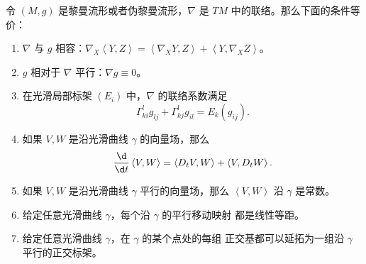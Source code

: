\documentclass[fontset=none]{Notes}
\newcommand{\inn}[1]{\left\langle #1\right\rangle}
\begin{document}
\begin{proposition}[度量联络的特征]\label{prop:metric connection}
  令 $(M,g)$ 是黎曼流形或者伪黎曼流形，$\nabla$ 是 $TM$ 中的联络。那么下面的条件等价：
  \begin{enumerate}
    \item $\nabla$ 与 $g$ 相容：$\nabla_X\inn{Y,Z}=\inn{\nabla_XY,Z}+\inn{Y,\nabla_XZ}$。
    \item $g$ 相对于 $\nabla$ 平行：$\nabla g\equiv 0$。
    \item 在光滑局部标架 $(E_i)$ 中，$\nabla $ 的联络系数满足
    \begin{equation}\label{eq:Delta g equiv 0}
      \Gamma_{ki}^lg_{lj}+\Gamma_{kj}^lg_{il}=E_k(g_{ij}).
    \end{equation}
    \item 如果 $V,W$ 是沿光滑曲线 $\gamma$ 的向量场，那么
    \begin{equation}
      \frac{\d}{\d t}\inn{V,W}=\inn{D_tV,W}+\inn{V,D_tW}.
    \end{equation}
    \item 如果 $V,W$ 是沿光滑曲线 $\gamma$ 平行的向量场，那么 $\inn{V,W}$
    沿 $\gamma$ 是常数。
    \item 给定任意光滑曲线 $\gamma$，每个沿 $\gamma$ 的平行移动映射
    都是线性等距。
    \item 给定任意光滑曲线 $\gamma$，在 $\gamma$ 的某个点处的每组
    正交基都可以延拓为一组沿 $\gamma$ 平行的正交标架。
  \end{enumerate}
\end{proposition}
\end{document}
